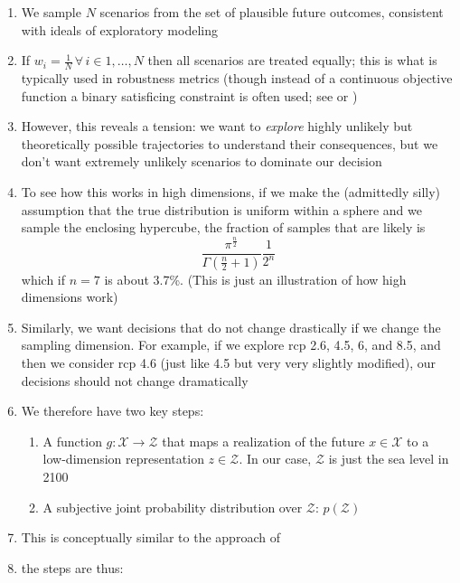 \documentclass[12pt]{article}
\begin{document}
\begin{enumerate}
    \item We sample $N$ scenarios from the set of plausible future outcomes, consistent with ideals of exploratory modeling \citep{bankes:1993} \citep[indeed we can use samples for scenario discovery;][]{kwakkel:2019}
    \item If $w_i = \frac{1}{N} \, \forall \, i \in 1, \ldots, N$ then all scenarios are treated equally; this is what is typically used in robustness metrics (though instead of a continuous objective function a binary satisficing constraint is often used; see \citealt{herman:2015} or \citealt{kwakkel:2019})
    \item However, this reveals a tension: we want to \emph{explore} highly unlikely but theoretically possible trajectories to understand their consequences, but we don't want extremely unlikely scenarios to dominate our decision
    \item To see how this works in high dimensions, if we make the (admittedly silly) assumption that the true distribution is uniform within a sphere and we sample the enclosing hypercube, the fraction of samples that are likely is
          $$ \frac{\pi^\frac{n}{2}}{\Gamma(\frac{n}{2} + 1)} \frac{1}{2^n}$$
          which if $n=7$ is about 3.7\%. (This is just an illustration of how high dimensions work)
    \item Similarly, we want decisions that do not change drastically if we change the sampling dimension. For example, if we explore \gls{rcp} 2.6, 4.5, 6, and 8.5, and then we consider \gls{rcp} 4.6 (just like 4.5 but very very slightly modified), our decisions should not change dramatically
    \item We therefore have two key steps:
          \begin{enumerate}
              \item A function $g: \mathcal{X} \rightarrow \mathcal{Z}$ that maps a realization of the future $x \in \mathcal{X}$ to a low-dimension representation $z \in \mathcal{Z}$. In our case, $\mathcal{Z}$ is just the sea level in 2100
              \item A subjective joint probability distribution over $\mathcal{Z}$: $p(\mathcal{Z})$
          \end{enumerate}
    \item This is conceptually similar to the approach of \citet{garner_slrise:2018}
    \item the steps are thus:
          \begin{enumerate}

\end{enumerate}
\end{enumerate}
\end{document}
